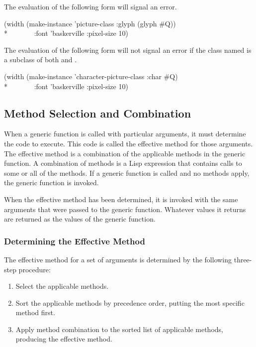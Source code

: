 The evaluation of the following form will signal an error.

\begin{lisp}
(width (make-instance 'picture-class :glyph (glyph \#{\Xbackslash}Q)) \\*
~~~~~~~:font 'baskerville :pixel-size 10)
\end{lisp}

The evaluation of the following form will not signal an error
if the class named  is a subclass of
both  and .

\begin{lisp}
(width (make-instance 'character-picture-class :char \#{\Xbackslash}Q) \\*
~~~~~~~:font 'baskerville :pixel-size 10)
\end{lisp}


\subsection{Method Selection and Combination}
\label{Method-Selection-and-Combination-SECTION}

When a generic function is called with particular arguments, it must
determine the code to execute.  This code is called the {\bit effective
method\/} for those arguments.  The effective method is a {\bit
combination\/} of the applicable methods in the generic function.  A
combination of methods is a Lisp expression that contains calls to some or
all of the methods.  If a generic function is
called and no methods apply, the generic function 
 is invoked.

When the effective method has been determined, it is invoked with the same
arguments that were passed to the generic function.  Whatever values it
returns are returned as the values of the generic function.

\subsubsection{Determining the Effective Method}
\label{Determining-the-Effective-Method-SECTION}

The effective method for a set of
arguments is determined by the following three-step procedure:

\begin{enumerate}

\item Select the applicable methods.

\item Sort the applicable methods by precedence order, putting
the most specific method first.

\item Apply method combination to the sorted list of
applicable methods, producing the effective method.

\end{enumerate}

